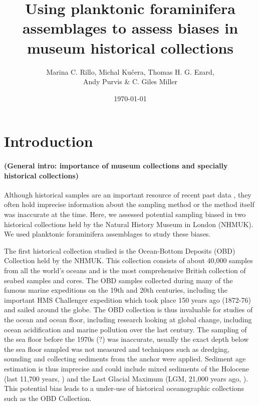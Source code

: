 \documentclass[a4paper]{article}
\title{Using planktonic foraminifera assemblages to assess biases in museum historical collections}
\author{Marina C. Rillo, Michal Kučera, Thomas H. G. Ezard, \\ Andy Purvis \& C. Giles Miller}
\date{\today}
\begin{document}
\maketitle



\section{Introduction}
\label{sec:intro}

\paragraph{(General intro: importance of museum collections and specially historical collections)}
Although historical samples are an important resource of recent past data \citep{lister2011natural}, they often hold imprecise information about the sampling method or the method itself was inaccurate at the time. Here, we assessed potential sampling biased in two historical collections held by the Natural History Museum in London (NHMUK). We used planktonic foraminifera assemblages to study these biases.

The first historical collection studied is the Ocean-Bottom Deposits (OBD) Collection held by the NHMUK. This collection consists of about 40,000 samples from all the world's oceans and is the most comprehensive British collection of seabed samples and cores.
The OBD samples collected during many of the famous marine expeditions on the 19th and 20th centuries, including the important HMS Challenger expedition which took place 150 years ago (1872-76) and sailed around the globe.
The OBD collection is thus invaluable for studies of the ocean and ocean floor, including research looking at global change, including ocean acidification and marine pollution over the last century. 
The sampling of the sea floor before the 1970s (?) was inaccurate, usually the exact depth below the sea floor sampled was not measured and techniques such as dredging, sounding and collecting sediments from the anchor were applied. 
Sediment age estimation is thus imprecise and could include mixed sediments of the Holocene (last 11,700 years, \citealt{walker2008global}) and the Last Glacial Maximum (LGM, 21,000 years ago, \citealt{margo2009lgm}).
This potential bias leads to a under-use of historical oceanographic collections such as the OBD Collection.
\end{document}
